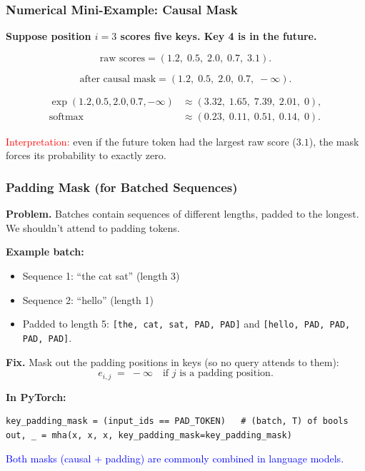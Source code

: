 \documentclass[notes,11pt, aspectratio=169]{beamer}
\DeclareMathOperator{\softmax}{softmax}
\begin{document}
\begin{frame}
\frametitle{Numerical Mini-Example: Causal Mask}

\textbf{Suppose position $i=3$ scores five keys. Key 4 is in the future.}

\vspace{4pt}
\[
    \text{raw scores}
    =
    (1.2,\; 0.5,\; 2.0,\; 0.7,\; 3.1).
\]

\vspace{2pt}
\[
    \text{after causal mask}
    =
    (1.2,\; 0.5,\; 2.0,\; 0.7,\; -\infty).
\]

\vspace{2pt}
\begin{align*}
    \exp(1.2,0.5,2.0,0.7,-\infty)
    &\approx (3.32,\;1.65,\;7.39,\;2.01,\;0), \\
    \softmax
    &\approx (0.23,\;0.11,\;0.51,\;0.14,\;0).
\end{align*}

\textcolor{red}{Interpretation:} even if the future token had the largest raw score ($3.1$), the mask forces its probability to exactly zero.
\end{frame}

\begin{frame}[fragile]
\frametitle{Padding Mask (for Batched Sequences)}

\textbf{Problem.} Batches contain sequences of different lengths, padded to the longest. We shouldn't attend to padding tokens.

\vspace{6pt}
\textbf{Example batch:}
\begin{itemize}
    \item Sequence 1: ``the cat sat'' (length 3)
    \item Sequence 2: ``hello'' (length 1)
    \item Padded to length 5: \texttt{[the, cat, sat, PAD, PAD]} and \texttt{[hello, PAD, PAD, PAD, PAD]}.
\end{itemize}

\vspace{8pt}
\textbf{Fix.} Mask out the padding positions in keys (so no query attends to them):
\[
    e_{i,j} \;=\; -\infty \quad \text{if $j$ is a padding position}.
\]

\vspace{6pt}
\textbf{In PyTorch:}
\begin{lstlisting}[basicstyle=\ttfamily\scriptsize]
key_padding_mask = (input_ids == PAD_TOKEN)   # (batch, T) of bools
out, _ = mha(x, x, x, key_padding_mask=key_padding_mask)
\end{lstlisting}

\vspace{4pt}
\textcolor{blue}{Both masks (causal + padding) are commonly combined in language models.}
\end{frame}
\end{document}

